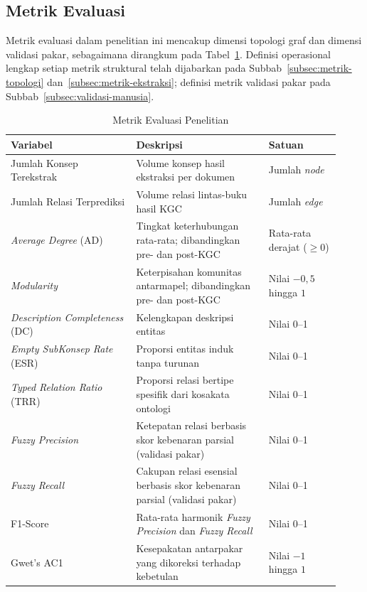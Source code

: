\documentclass[../../thesis]{subfiles}
\begin{document}
\subsection{Metrik Evaluasi}\label{subsec:metrik-evaluasi}

Metrik evaluasi dalam penelitian ini mencakup dimensi topologi graf dan
dimensi validasi pakar, sebagaimana dirangkum pada
Tabel~\ref{tab:metrik}. Definisi operasional lengkap setiap metrik
struktural telah dijabarkan pada Subbab~\ref{subsec:metrik-topologi}
dan~\ref{subsec:metrik-ekstraksi}; definisi
metrik validasi pakar pada Subbab~\ref{subsec:validasi-manusia}.

\begin{table}[htbp]
\centering
\caption{Metrik Evaluasi Penelitian}
\label{tab:metrik}
\begin{tabular}{@{}p{0.35\linewidth}p{0.37\linewidth}p{0.20\linewidth}@{}}
  \toprule
  \textbf{Variabel} & \textbf{Deskripsi} & \textbf{Satuan} \\
  \midrule
  Jumlah Konsep Terekstrak
    & Volume konsep hasil ekstraksi per dokumen
    & Jumlah \textit{node} \\
  Jumlah Relasi Terprediksi
    & Volume relasi lintas-buku hasil KGC
    & Jumlah \textit{edge} \\
  \textit{Average Degree} (AD)
    & Tingkat keterhubungan rata-rata; dibandingkan pre- dan post-KGC
    & Rata-rata derajat ($\geq 0$) \\
  \textit{Modularity}
    & Keterpisahan komunitas antarmapel; dibandingkan pre- dan post-KGC
    & Nilai $-0{,}5$ hingga $1$ \\
  \textit{Description Completeness} (DC)
    & Kelengkapan deskripsi entitas
    & Nilai 0--1 \\
  \textit{Empty SubKonsep Rate} (ESR)
    & Proporsi entitas induk tanpa turunan
    & Nilai 0--1 \\
  \textit{Typed Relation Ratio} (TRR)
    & Proporsi relasi bertipe spesifik dari kosakata ontologi
    & Nilai 0--1 \\
  \textit{Fuzzy Precision}
    & Ketepatan relasi berbasis skor kebenaran parsial (validasi pakar)
    & Nilai 0--1 \\
  \textit{Fuzzy Recall}
    & Cakupan relasi esensial berbasis skor kebenaran parsial (validasi pakar)
    & Nilai 0--1 \\
  F1-Score
    & Rata-rata harmonik \textit{Fuzzy Precision} dan \textit{Fuzzy Recall}
    & Nilai 0--1 \\
  Gwet's AC1
    & Kesepakatan antarpakar yang dikoreksi terhadap kebetulan
    & Nilai $-1$ hingga $1$ \\
\end{tabular}
\end{table}
\end{document}
